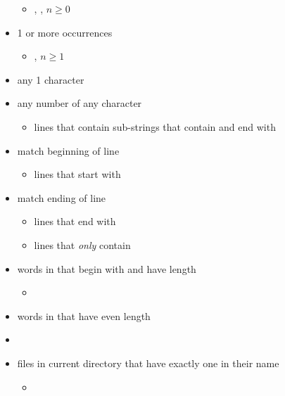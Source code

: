 \begin{itemize}
\begin{itemize}
              \item {} \textrightarrow{} ,
                    , $ n\ge 0 $
          \end{itemize}
    \item \code{+} \textrightarrow{} 1 or more occurrences
          \begin{itemize}
              \item {} \textrightarrow{}
                    , $ n\ge 1 $
          \end{itemize}
    \item {} \textrightarrow{} any 1 character
    \item {} \textrightarrow{} any number of any character
          \begin{itemize}
              \item {} \textrightarrow{} lines that contain sub-strings
                    that contain  and end with 
          \end{itemize}
    \item \code{\textasciicircum} \textrightarrow{} match beginning of line
          \begin{itemize}
              \item {} lines that start with 
          \end{itemize}
    \item \code{\$} \textrightarrow{} match ending of line
          \begin{itemize}
              \item {} \textrightarrow{} lines that end with 
              \item {}
                    \textrightarrow{} lines that \emph{only} contain
          \end{itemize}
    \item words in  that begin with  and have length 
          \begin{itemize}
              \item {}

          \end{itemize}
    \item words in  that have even length
    \item {}
    \item files in current directory that have exactly one  in their
          name
          \begin{itemize}
              \item {}
          \end{itemize}
\end{itemize}


